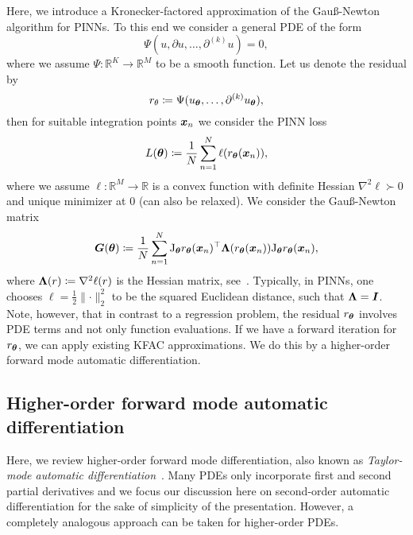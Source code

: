 Here, we introduce a Kronecker-factored approximation of the Gauß-Newton algorithm for PINNs. 
To this end we consider a general PDE of the form
\begin{equation}
    \Psi(u, \partial u, \dots, \partial^{(k)} u) = 0,
\end{equation}
where we assume $\Psi\colon \mathbb R^K\to\mathbb R^M$ to be a smooth function.
Let us denote the residual by 
\begin{equation}
    r_\theta\coloneqq \Psi(u_{\bm{\theta}}, \dots, \partial^{(k)} u_{\bm{\theta}}),
\end{equation} 
then for suitable integration points ${\bm{x}}_n$ we consider the PINN loss
\begin{equation}
    L({\bm{\theta}})\coloneqq \frac1N\sum_{n=1}^N \ell(r_{{\bm{\theta}}}({\bm{x}}_n)),
\end{equation}
where we assume $\ell\colon\mathbb R^M\to\mathbb R$ is a convex function with definite Hessian $\nabla^2\ell\succ0$ and unique minimizer at $0$ (can also be relaxed). 
We consider the Gauß-Newton matrix
\begin{equation}
    {\bm{G}}({\bm{\theta}}) \coloneqq \frac1N\sum_{n=1}^N \mathrm{J}_{\bm{\theta}} r_{\bm{\theta}}({\bm{x}}_n)^\top {\bm{\Lambda}}(r_{\bm{\theta}}({\bm{x}}_n)) \mathrm{J}_{\bm{\theta}} r_{\bm{\theta}}({\bm{x}}_n),
\end{equation}
where ${\bm{\Lambda}}(r)\coloneqq \nabla^2 \ell(r)$ is the Hessian matrix, see~\cite{eschenhagen2023kroneckerfactored}. 
Typically, in PINNs, one chooses $\ell = \frac12\lVert \cdot \rVert_2^2$ to be the squared Euclidean distance, such that ${\bm{\Lambda}} = {\bm{I}}$. 
Note, however, that in contrast to a regression problem, the residual $r_{\bm{\theta}}$ involves PDE terms and not only function evaluations. 
If we have a forward iteration for $r_{\bm{\theta}}$, we can apply existing KFAC approximations. 
We do this by a higher-order forward mode automatic differentiation. 



\subsection{Higher-order forward mode automatic differentiation}
\label{sec:taylor-mode-AD}

Here, we review higher-order forward mode differentiation, also known as \emph{Taylor-mode automatic differentiation}~\citep{griewank1996algorithm, griewank2008evaluating, bettencourt2019taylor}. 
Many PDEs only incorporate first and second partial derivatives and we focus our discussion here on second-order automatic differentiation for the sake of simplicity of the presentation. 
However, a completely analogous approach can be taken for higher-order PDEs. 

